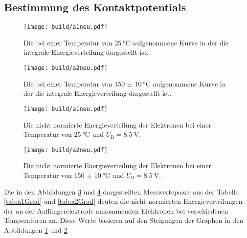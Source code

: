 \subsection{Bestimmung des Kontaktpotentials}
\begin{figure}
	\centering
	\caption{Die bei einer Temperatur von $\SI{25}{\degreeCelsius}$ aufgenommene Kurve in der die integrale Energieverteilung dargestellt ist.}
	\texttt{[image: build/a1neu.pdf]}
	\label{fig:a1}
\end{figure}
\begin{figure}
	\centering
	\caption{Die bei einer Temperatur von $\SI{150(10)}{\degreeCelsius}$ aufgenommene Kurve in der die integrale Energieverteilung dargestellt ist.}
	\texttt{[image: build/a2neu.pdf]}
	\label{fig:a2}
\end{figure}
\begin{figure}
	\centering
	\caption{Die nicht normierte Energieverteilung der Elektronen bei einer Temperatur von $\SI{25}{\degreeCelsius}$ und $U_\text{B}=\SI{8.5}{\volt}$.}
	\texttt{[image: build/a1neu.pdf]}
	\label{fig:a1A}
\end{figure}
\begin{figure}
	\centering
	\caption{Die nicht normierte Energieverteilung der Elektronen bei einer Temperatur von $\SI{150(10)}{\degreeCelsius}$ und $U_\text{B}=\SI{8.5}{\volt}$.}
	\texttt{[image: build/a2neu.pdf]}
	\label{fig:a2A}
\end{figure}
\begin{table}
	\caption{Das bei den verschieden Gegenspannungen $U_\text{A}$ gemessene Gefälle $\overline{I}$ des Graphen in Abbildung \ref{fig:a1}.}
	\centering
	
\end{table}
\begin{table}
	\caption{Das bei den verschieden Gegenspannungen $U_\text{A}$ gemessene Gefälle $\overline{I}$ des Graphen in Abbildung \ref{fig:a2}.}
	\centering
	
\end{table}
Die in den Abbildungen \ref{fig:a1A} und \ref{fig:a2A} dargestellten Messwertepaare aus der Tabelle \ref{tab:a1Grad} und \ref{tab:a2Grad} deuten die nicht normierten Energieverteilungen der an der Auffängerelektrode ankommenden Elektronen bei verschiedenen Temperaturen an. Diese Werte basieren auf den Steigungen der Graphen in den Abbildungen \ref{fig:a1} und \ref{fig:a2}
